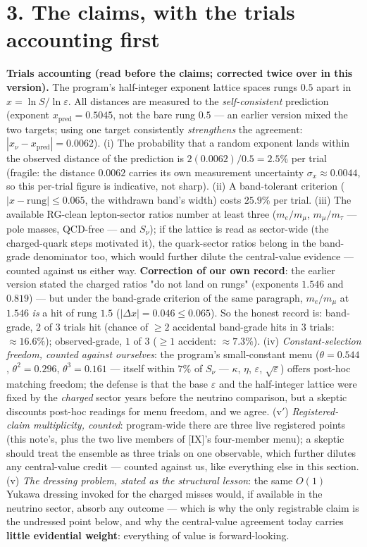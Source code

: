 \documentclass[11pt]{article}
\begin{document}
\section*{3. The claims, with the trials accounting first}
\textbf{Trials accounting (read before the claims; corrected twice over in this version).}  The program's half-integer exponent lattice spaces rungs $0.5$ apart in $x = \ln S/\ln\varepsilon$.  All distances are measured to the \emph{self-consistent} prediction (exponent $x_{\mathrm{pred}} = 0.5045$, not the bare rung $0.5$ — an earlier version mixed the two targets; using one target consistently \emph{strengthens} the agreement: $|x_\nu - x_{\mathrm{pred}}| = 0.0062$).  (i) The probability that a random exponent lands within the observed distance of the prediction is $2(0.0062)/0.5 = 2.5\%$ per trial (fragile: the distance $0.0062$ carries its own measurement uncertainty $\sigma_x \approx 0.0044$, so this per-trial figure is indicative, not sharp). (ii) A band-tolerant criterion ($|x - \mathrm{rung}| \le 0.065$, the withdrawn band's width) costs $25.9\%$ per trial.  (iii) The available RG-clean lepton-sector ratios number at least three ($m_e/m_\mu$, $m_\mu/m_\tau$ — pole masses, QCD-free — and $S_\nu$); if the lattice is read as sector-wide (the charged-quark steps motivated it), the quark-sector ratios belong in the band-grade denominator too, which would further dilute the central-value evidence — counted against us either way.  \textbf{Correction of our own record}: the earlier version stated the charged ratios "do not land on rungs" (exponents $1.546$ and $0.819$) — but under the band-grade criterion of the same paragraph, $m_e/m_\mu$ at $1.546$ \emph{is} a hit of rung $1.5$ ($|\Delta x| = 0.046 \le 0.065$).  So the honest record is: band-grade, $2$ of $3$ trials hit (chance of $\ge 2$ accidental band-grade hits in $3$ trials: $\approx 16.6\%$); observed-grade, $1$ of $3$ ($\ge 1$ accident: $\approx 7.3\%$). (iv) \emph{Constant-selection freedom, counted against ourselves}: the program's small-constant menu ($\theta = 0.544$, $\theta^2 = 0.296$, $\theta^3 = 0.161$ — itself within $7\%$ of $S_\nu$ — $\kappa$, $\eta$, $\varepsilon$, $\sqrt\varepsilon$) offers post-hoc matching freedom; the defense is that the base $\varepsilon$ and the half-integer lattice were fixed by the \emph{charged} sector years before the neutrino comparison, but a skeptic discounts post-hoc readings for menu freedom, and we agree. (v$'$) \emph{Registered-claim multiplicity, counted}: program-wide there are three live registered points (this note's, plus the two live members of [IX]'s four-member menu); a skeptic should treat the ensemble as three trials on one observable, which further dilutes any central-value credit — counted against us, like everything else in this section.  (v) \emph{The dressing problem, stated as the structural lesson}: the same $O(1)$ Yukawa dressing invoked for the charged misses would, if available in the neutrino sector, absorb any outcome — which is why the only registrable claim is the undressed point below, and why the central-value agreement today carries \textbf{little evidential weight}: everything of value is forward-looking.
\end{document}
